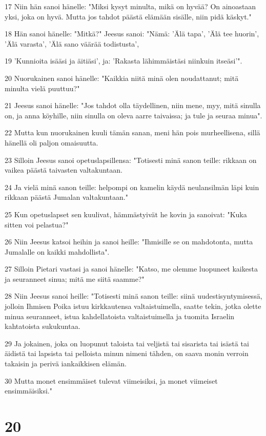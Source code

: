 \par 17 Niin hän sanoi hänelle: "Miksi kysyt minulta, mikä on hyvää? On ainoastaan yksi, joka on hyvä. Mutta jos tahdot päästä elämään sisälle, niin pidä käskyt."
\par 18 Hän sanoi hänelle: "Mitkä?" Jeesus sanoi: "Nämä: 'Älä tapa', 'Älä tee huorin', 'Älä varasta', 'Älä sano väärää todistusta',
\par 19 'Kunnioita isääsi ja äitiäsi', ja: 'Rakasta lähimmäistäsi niinkuin itseäsi'".
\par 20 Nuorukainen sanoi hänelle: "Kaikkia niitä minä olen noudattanut; mitä minulta vielä puuttuu?"
\par 21 Jeesus sanoi hänelle: "Jos tahdot olla täydellinen, niin mene, myy, mitä sinulla on, ja anna köyhille, niin sinulla on oleva aarre taivaissa; ja tule ja seuraa minua".
\par 22 Mutta kun nuorukainen kuuli tämän sanan, meni hän pois murheellisena, sillä hänellä oli paljon omaisuutta.
\par 23 Silloin Jeesus sanoi opetuslapsillensa: "Totisesti minä sanon teille: rikkaan on vaikea päästä taivasten valtakuntaan.
\par 24 Ja vielä minä sanon teille: helpompi on kamelin käydä neulansilmän läpi kuin rikkaan päästä Jumalan valtakuntaan."
\par 25 Kun opetuslapset sen kuulivat, hämmästyivät he kovin ja sanoivat: "Kuka sitten voi pelastua?"
\par 26 Niin Jeesus katsoi heihin ja sanoi heille: "Ihmisille se on mahdotonta, mutta Jumalalle on kaikki mahdollista".
\par 27 Silloin Pietari vastasi ja sanoi hänelle: "Katso, me olemme luopuneet kaikesta ja seuranneet sinua; mitä me siitä saamme?"
\par 28 Niin Jeesus sanoi heille: "Totisesti minä sanon teille: siinä uudestisyntymisessä, jolloin Ihmisen Poika istuu kirkkautensa valtaistuimella, saatte tekin, jotka olette minua seuranneet, istua kahdellatoista valtaistuimella ja tuomita Israelin kahtatoista sukukuntaa.
\par 29 Ja jokainen, joka on luopunut taloista tai veljistä tai sisarista tai isästä tai äidistä tai lapsista tai pelloista minun nimeni tähden, on saava monin verroin takaisin ja perivä iankaikkisen elämän.
\par 30 Mutta monet ensimmäiset tulevat viimeisiksi, ja monet viimeiset ensimmäisiksi."

\chapter{20}

